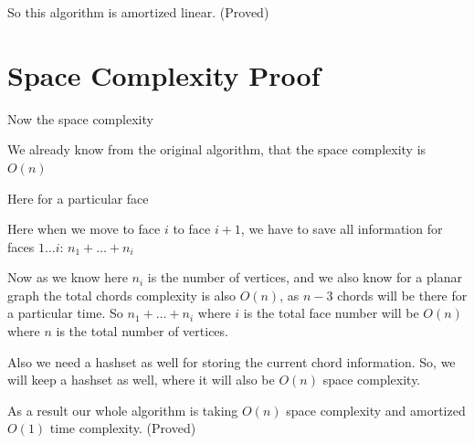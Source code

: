 \documentclass[12pt,a4paper]{article}
\begin{document}
So this algorithm is amortized linear. (Proved)

\section{Space Complexity Proof}

Now the space complexity

We already know from the original algorithm, that the space complexity is $O(n)$

Here for a particular face

Here when we move to face $i$ to face $i+1$, we have to save all information for faces $1 \ldots i$: $n_1 + \ldots + n_i$

Now as we know here $n_i$ is the number of vertices, and we also know for a planar graph the total chords complexity is also $O(n)$, as $n-3$ chords will be there for a particular time. So $n_1 + \ldots + n_i$ where $i$ is the total face number will be $O(n)$ where $n$ is the total number of vertices.

Also we need a hashset as well for storing the current chord information. So, we will keep a hashset as well, where it will also be $O(n)$ space complexity.

As a result our whole algorithm is taking $O(n)$ space complexity and amortized $O(1)$ time complexity. (Proved)
\end{document}
